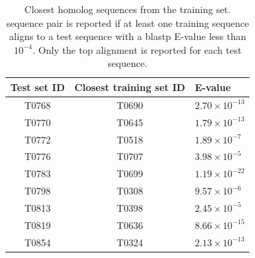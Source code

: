 \documentclass[letter,10pt]{article}
\begin{document}
\newpage
\begin{table}[H]
\begin{center}
%
    \caption{Closest homolog sequences from the training set.
      sequence pair is reported if at least one training sequence
      aligns to a test sequence with a blastp E-value less than
      $10^{-4}$. Only the top alignment is reported for each test
      sequence.}
%
\begin{tabular}{ c | c | l }
    
    Test set ID & Closest training set ID & E-value \\
    \hline
    T0768 & T0690 & $2.70\times 10^{-13}$ \\
    T0770 & T0645 & $1.79\times 10^{-13}$ \\
    T0772 & T0518 & $1.89\times 10^{-7}$ \\
    T0776 & T0707 & $3.98\times 10^{-5}$ \\
    T0783 & T0699 & $1.19\times 10^{-22}$ \\
    T0798 & T0308 & $9.57\times 10^{-6}$ \\
    T0813 & T0398 & $2.45\times 10^{-5}$ \\
    T0819 & T0636 & $8.66\times 10^{-15}$ \\
    T0854 & T0324 & $2.13\times 10^{-13}$ \\
\end{tabular}
\label{Tbl:datasetsSimilarity}
\end{center}
\end{table}
\end{document}
